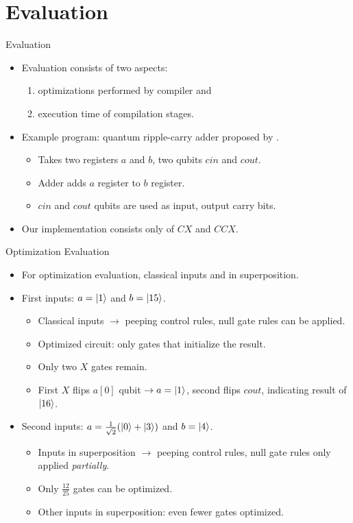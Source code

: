 \section{Evaluation}
\begin{frame}{Evaluation}
    \begin{itemize}
        \item Evaluation consists of two aspects:
        \begin{enumerate}
            \item optimizations performed by compiler and
            \item execution time of compilation stages.
        \end{enumerate}
        \item Example program: quantum ripple-carry adder proposed by \cite{CDKM04}.
        \begin{itemize}
            \item Takes two registers $a$ and $b$, two qubits $cin$ and $cout$.
            \item Adder adds $a$ register to $b$ register.
            \item $cin$ and $cout$ qubits are used as input, output carry bits.
        \end{itemize}
        \item Our implementation consists only of $CX$ and $CCX$.
    \end{itemize}
\end{frame}

\begin{frame}{Optimization Evaluation}
    \begin{itemize}
        \item For optimization evaluation, classical inputs and in superposition.
        \item First inputs: $a = \ket{1}$ and $b = \ket{15}$.
        \begin{itemize}
            \item Classical inputs $\to$ peeping control rules, null gate rules can be applied.
            \item Optimized circuit: only gates that initialize the result.
            \item Only two $X$ gates remain. 
            \item First $X$ flips $a[0]$ qubit $\to a = \ket{1}$, second flips $cout$, indicating result of $\ket{16}$.
        \end{itemize}
        \item Second inputs: $a = \frac{1}{\sqrt{2}} (\ket{0} + \ket{3})$ and $b = \ket{4}$.
        \begin{itemize}
            \item Inputs in superposition $\to$ peeping control rules, null gate rules only applied \emph{partially}.
            \item Only $\frac{12}{25}$ gates can be optimized.
            \item Other inputs in superposition: even fewer gates optimized.
        \end{itemize}
    \end{itemize}
\end{frame}

